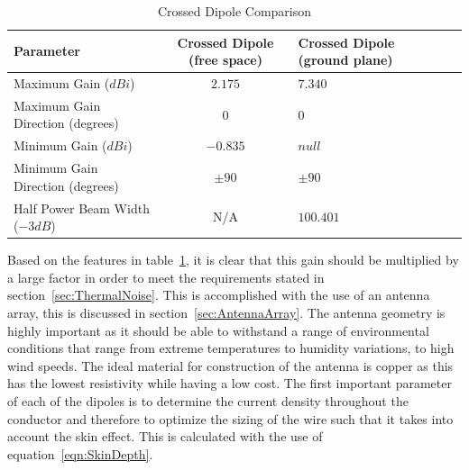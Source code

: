 \documentclass[11pt]{witseiepaper}
\begin{document}
\begin{table}[htb]
    \caption{Crossed Dipole Comparison}
    \label{tab:AntennaConfigurations}
    \begin{center}
        \begin{tabular}{p{60mm}cp{40mm}cp{40mm}}
            \hline 
            Parameter & Crossed Dipole (free space) & Crossed Dipole (ground plane) \\
            \hline
            Maximum Gain ($dBi$) & $2.175$ & $7.340$ \\
            Maximum Gain Direction (degrees) & $0$ & $0$ \\
            Minimum Gain ($dBi$) & $-0.835$ & $null$ \\
            Minimum Gain Direction (degrees) & $\pm 90$ & $\pm 90$ \\
            Half Power Beam Width ($-3 dB$) & N/A & $100.401$ \\
            \hline
        \end{tabular}
    \end{center}
\end{table}
Based on the features in table~\ref{tab:AntennaConfigurations}, it is clear that this gain should be multiplied by a large factor in order to meet the requirements stated in section~\ref{sec:ThermalNoise}. This is accomplished with the use of an antenna array, this is discussed in section~\ref{sec:AntennaArray}.
The antenna geometry is highly important as it should be able to withstand a range of environmental conditions that range from extreme temperatures to humidity variations, to high wind speeds.
The ideal material for construction of the antenna is copper as this has the lowest resistivity while having a low cost.
The first important parameter of each of the dipoles is to determine the current density throughout the conductor and therefore to optimize the sizing of the wire such that it takes into account the skin effect.
This is calculated with the use of equation~\ref{eqn:SkinDepth}.
\end{document}
